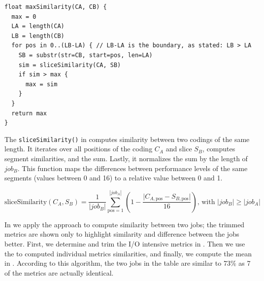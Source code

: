 \documentclass{jhps}
\begin{document}
\begin{lstlisting}[caption={Pseudo code of the maxSimilarity() function}]
float maxSimilarity(CA, CB) {
  max = 0
  LA = length(CA)
  LB = length(CB)
  for pos in 0..(LB-LA) { // LB-LA is the boundary, as stated: LB > LA
    SB = substr(str=CB, start=pos, len=LA)
    sim = sliceSimilarity(CA, SB)
    if sim > max {
      max = sim
    }
  }
  return max
}
\end{lstlisting}

The \texttt{sliceSimilarity()} in  computes similarity between two codings of the same length.
It iterates over all positions of the coding $C_A$ and slice $S_B$, computes segment similarities, and the sum.
Lastly, it normalizes the sum by the length of $job_B$.
This function maps the differences between performance levels of the same segments (values between 0 and 16) to a relative value between 0 and 1.

\begin{equation}
	\text{sliceSimilarity}\left(C_{A},S_{B}\right) = \frac{1}{|job_B|}\sum_{\text{pos}=1}^{|job_A|} \left(1 - \frac{\vert C_{A,\text{pos}}-S_{B,\text{pos}} \vert }{16}\right)\text{, with }|job_{B}| \geq |job_{A}| \label{eq:slicesim}
\end{equation}

In  we apply the approach to compute similarity between two jobs; the trimmed metrics are shown only to highlight similarity and difference between the jobs better.
First, we determine and trim the I/O intensive metrics in .
Then we use the  to computed individual metrics similarities, and finally, we compute the mean in .
According to this algorithm, the two jobs in the table are similar to 73\% as 7 of the metrics are actually identical.
\end{document}

